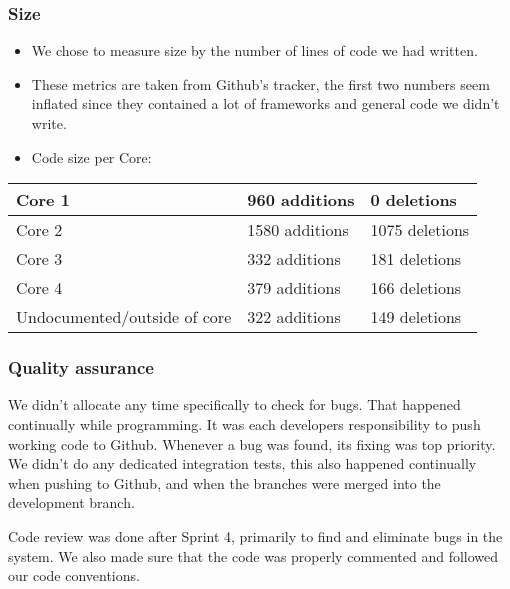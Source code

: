 \subsubsection{Size}
\begin{itemize}
    \item We chose to measure size by the number of lines of code we had written.
    \item These metrics are taken from Github's tracker, the first two numbers seem inflated since they contained a lot of frameworks and general code we didn't write.
    \item Code size per Core: 
\end{itemize}
\begin{adjustbox}{center}
\begin{tabular}{l|l|l} %
        Core 1 & 960 additions & 0 deletions \\ \hline
        Core 2 & 1580 additions & 1075 deletions \\ \hline
        Core 3 & 332 additions & 181 deletions \\ \hline
        Core 4 & 379 additions & 166 deletions \\ \hline
        Undocumented/\break outside of core & 322 additions & 149 deletions \\
\end{tabular}
\end{adjustbox}

\subsubsection{Quality assurance}
We didn't allocate any time specifically to check for bugs. That happened continually while programming. It was each developers responsibility to push working code to Github. Whenever a bug was found, its fixing was top priority. We didn't do any dedicated integration tests, this also happened continually when pushing to Github, and when the branches were merged into the development branch.

Code review was done after Sprint 4, primarily to find and eliminate bugs in the system. We also made sure that the code was properly commented and followed our code conventions.
